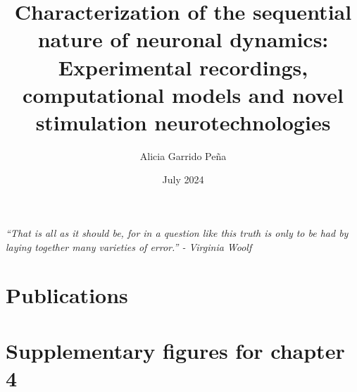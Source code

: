 \documentclass[11pt,a4paper,twoside]{book} %
\title{Characterization of the sequential nature of neuronal dynamics: Experimental recordings, computational models and novel stimulation neurotechnologies}
\author{Alicia Garrido Peña}
\date{July 2024}
\numberwithin{equation}{section}
\begin{document}
 \maketitle

 \newpage
 \clearpage
 \newpage
 
 \newpage
 \clearpage
 \vfill
 {\centering \large \textit{``That is all as it should be, for in a question like this truth is only to be had by laying together many
 		varieties of error.'' - Virginia Woolf}\par}

 \vfill
 
 


 \tableofcontents
 \listoftables
 \listoffigures

 \newpage



\resetpagenumbering

 
 
 
 

 
 
 


\printbibliography


\begin{appendix}
\chapter{Publications}

\begin{refsection}
\nocite{*}

\printbibliography[heading={subbibliography},title={Journal Publications},keyword=journal]

\printbibliography[heading={subbibliography},title={International Conference Contributions},keyword=conference]

\end{refsection}

\chapter{Supplementary figures for chapter 4}



%
% 


\end{appendix}
\end{document}
